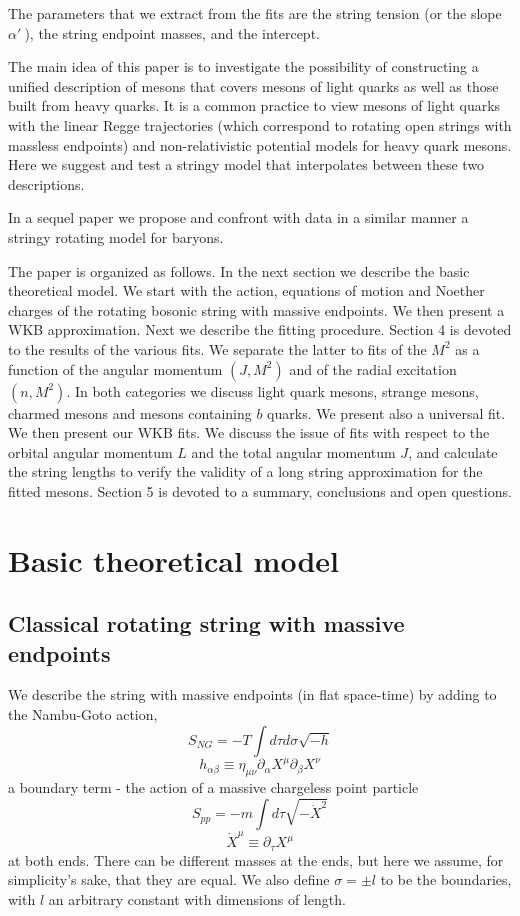 \documentclass[11pt,a4]{article}
\def\be{\begin{equation}}
\def\ee{\end{equation}}
\newcommand{\del}{\partial}
\newcommand{\alp}{\ensuremath{\alpha'\:}}
\begin{document}
The parameters that we extract from the fits are the string tension (or the slope $\alp$), the string endpoint masses, and the intercept.



The main idea of this paper is to investigate  the possibility of constructing a unified description of mesons that covers mesons of light quarks as well as those built from heavy quarks. It is a common practice to view mesons of light quarks with the linear Regge trajectories (which correspond to rotating open strings with massless endpoints) and non-relativistic potential models for heavy quark mesons. Here we suggest and test a stringy model that interpolates between these two descriptions.


In a sequel paper we propose and confront with data in a similar manner a stringy rotating model for baryons.


The paper is organized as follows. In the next section we describe the basic theoretical model. We start with the action, equations of motion and Noether charges of the rotating bosonic string with massive endpoints. We then present a WKB approximation. Next we describe the fitting procedure. Section 4 is devoted to the results of the various fits. We separate the latter to fits of the $M^2$ as a function of the angular momentum $(J,M^2)$ and of the radial excitation $(n,M^2)$. In both categories we discuss light quark mesons, strange  mesons, charmed mesons and mesons containing $b$ quarks. We present also a universal fit. We then present our WKB fits. We discuss the issue of fits with respect to the orbital angular momentum $L$ and the total angular momentum $J$, and calculate the string lengths to verify the validity of a long string approximation for the fitted mesons. Section 5 is devoted to a summary, conclusions and open questions.

\section{Basic theoretical model}
	\subsection{Classical rotating string with massive endpoints}
		We describe the string with massive endpoints (in flat space-time) by adding to the Nambu-Goto action,
		\be S_{NG} = -T\int\!\!{d\tau d\sigma \sqrt{-h}} \ee
		\[ h_{\alpha\beta} \equiv \eta_{\mu\nu} \del_\alpha X^\mu \del_\beta X^\nu \]
		a boundary term - the action of a massive chargeless point particle
		\be S_{pp} = -m\int\!\! d\tau \sqrt{-\dot{X}^2} \ee
		\[ \dot{X}^\mu \equiv \del_\tau X^\mu \]
		at both ends. There can be different masses at the ends, but here we assume, for simplicity's sake, that they are equal. We also define \(\sigma = \pm l\) to be the boundaries, with \(l\) an arbitrary constant with dimensions of length.
\end{document}
